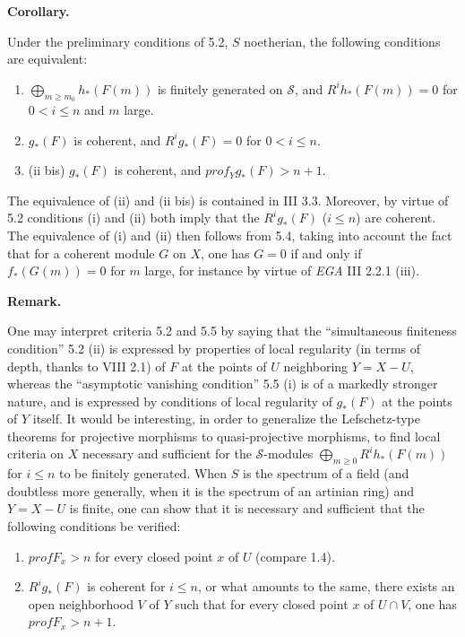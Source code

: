 \documentclass[
]{article}
\providecommand{\tightlist}{%
  \setlength{\itemsep}{0pt}\setlength{\parskip}{0pt}}
\begin{document}
\textbf{Corollary.}

Under the preliminary conditions of 5.2, \(S\) noetherian, the following
conditions are equivalent:

\begin{enumerate}
\def\labelenumi{\arabic{enumi}.}
\tightlist
\item
  \(\bigoplus_{m\geqslant m_{0}} h_{\ast}(F(m))\) is finitely generated
  on \(\mathcal{S}\), and \(R^{i}h_{\ast}(F(m)) = 0\) for
  \(0 < i \leqslant n\) and \(m\) large.
\item
  \(g_{\ast}(F)\) is coherent, and \(R^{i}g_{\ast}(F) = 0\) for
  \(0 < i \leqslant n\).
\item
  (ii bis) \(g_{\ast}(F)\) is coherent, and
  \(prof_{Y} g_{\ast}(F) > n + 1\).
\end{enumerate}

The equivalence of (ii) and (ii bis) is contained in III 3.3. Moreover,
by virtue of 5.2 conditions (i) and (ii) both imply that the
\(R^{i}g_{\ast}(F)\) (\(i \leqslant n\)) are coherent. The equivalence
of (i) and (ii) then follows from 5.4, taking into account the fact that
for a coherent module \(G\) on \(X\), one has \(G = 0\) if and only if
\(f_{\ast}(G(m)) = 0\) for \(m\) large, for instance by virtue of
\emph{EGA} III 2.2.1 (iii).

\textbf{Remark.}

One may interpret criteria 5.2 and 5.5 by saying that the ``simultaneous
finiteness condition'' 5.2 (ii) is expressed by properties of local
regularity (in terms of depth, thanks to VIII 2.1) of \(F\) at the
points of \(U\) neighboring \(Y = X - U\), whereas the ``asymptotic
vanishing condition'' 5.5 (i) is of a markedly stronger nature, and is
expressed by conditions of local regularity of \(g_{\ast}(F)\) at the
points of \(Y\) itself. It would be interesting, in order to generalize
the Lefschetz-type theorems for projective morphisms to quasi-projective
morphisms, to find local criteria on \(X\) necessary and sufficient for
the \(\mathcal{S}\)-modules
\(\bigoplus_{m\geqslant 0} R^{i}h_{\ast}(F(m))\) for \(i \leqslant n\)
to be finitely generated. When \(S\) is the spectrum of a field (and
doubtless more generally, when it is the spectrum of an artinian ring)
and \(Y = X - U\) is finite, one can show that it is necessary and
sufficient that the following conditions be verified:

\begin{enumerate}
\def\labelenumi{\arabic{enumi}.}
\tightlist
\item
  \(prof F_{x} > n\) for every closed point \(x\) of \(U\) (compare
  1.4).
\item
  \(R^{i}g_{\ast}(F)\) is coherent for \(i \leqslant n\), or what
  amounts to the same, there exists an open neighborhood \(V\) of \(Y\)
  such that for every closed point \(x\) of \(U \cap V\), one has
  \(prof F_{x} > n + 1\).
\end{enumerate}
\end{document}
